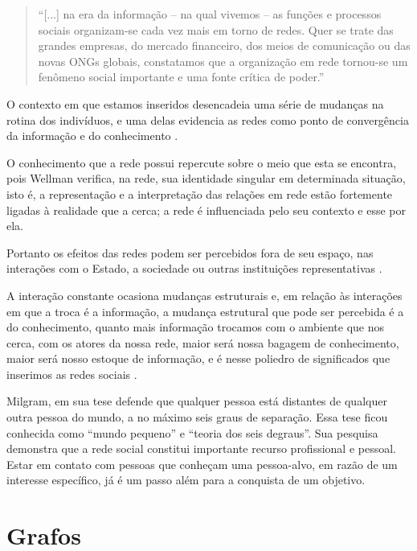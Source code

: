 \begin{quote}
	``[...] na era da informação – na qual vivemos – as
	funções e processos sociais organizam-se cada vez
	mais em torno de redes. Quer se trate das grandes
	empresas, do mercado financeiro, dos meios de
	comunicação ou das novas ONGs globais,
	constatamos que a organização em rede tornou-se
	um fenômeno social importante e uma fonte crítica
	de poder.'' \cite{Capra:2002}
\end{quote}

O contexto em que estamos inseridos desencadeia uma série de mudanças na rotina dos indivíduos, e uma delas evidencia as redes como ponto de convergência da informação e do conhecimento \cite{Tomae:Alcara:Chiara:2005}.

O conhecimento que a rede possui repercute sobre o meio que esta se encontra, pois Wellman \cite{Wellman:1996} verifica, na rede, sua identidade singular em determinada situação, isto é, a representação e a interpretação das relações em rede estão fortemente ligadas à realidade que a cerca; a rede é influenciada pelo seu contexto e esse por ela.

Portanto os efeitos das redes podem ser percebidos fora de seu espaço, nas interações com o Estado, a sociedade ou outras instituições representativas \cite{Marteleto:2001}.

A interação constante ocasiona mudanças estruturais e, em relação às interações em que a troca é a informação, a mudança estrutural que pode ser percebida é a do conhecimento, quanto mais informação trocamos com o ambiente que nos cerca, com os atores da nossa rede, maior será nossa bagagem de conhecimento, maior será nosso estoque de informação, e é nesse poliedro de significados que inserimos as redes sociais \cite{Tomae:Alcara:Chiara:2005}.

Milgram, em sua tese \cite{Milgram:1967} defende que qualquer pessoa está distantes de qualquer outra pessoa do mundo, a no máximo seis graus de separação. Essa tese ficou conhecida como ``mundo pequeno'' e ``teoria dos seis degraus''. Sua pesquisa demonstra que a rede social constitui importante recurso profissional e pessoal. Estar em contato com pessoas que conheçam uma pessoa-alvo, em razão de um interesse específico, já é um passo além para a conquista de um objetivo.

\section{Grafos}

